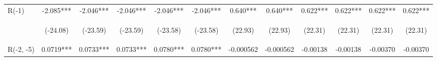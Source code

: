 \documentclass[]{article}
\begin{document}
\begin{center}
\begin{tabular}{lccccccccccc}
        R(-1)            & -2.085***                                      & -2.046***                                      & -2.046***                                      & -2.046***                                      & -2.046***                                      & 0.640***                                        & 0.640***                                        & 0.622***                                       & 0.622***                                       & 0.622***                                       & 0.622***                                       \\
        \vspace{4pt}     & \begin{footnotesize}(-24.08)\end{footnotesize} & \begin{footnotesize}(-23.59)\end{footnotesize} & \begin{footnotesize}(-23.59)\end{footnotesize} & \begin{footnotesize}(-23.58)\end{footnotesize} & \begin{footnotesize}(-23.58)\end{footnotesize} & \begin{footnotesize}(22.93)\end{footnotesize}   & \begin{footnotesize}(22.93)\end{footnotesize}   & \begin{footnotesize}(22.31)\end{footnotesize}  & \begin{footnotesize}(22.31)\end{footnotesize}  & \begin{footnotesize}(22.31)\end{footnotesize}  & \begin{footnotesize}(22.31)\end{footnotesize}  \\
        R(-2, -5)        & 0.0719***                                      & 0.0733***                                      & 0.0733***                                      & 0.0780***                                      & 0.0780***                                      & -0.000562                                       & -0.000562                                       & -0.00138                                       & -0.00138                                       & -0.00370                                       & -0.00370                                       \\

\end{tabular}
\end{center}
\end{document}
